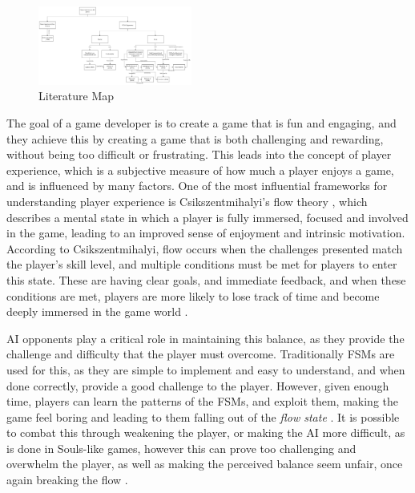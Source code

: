 \documentclass[conference]{IEEEtran}
\begin{document}
\begin{figure}[htbp]
	\centering
	\includegraphics[width=0.45\textwidth]{Images/Literature_Map.png}
	\caption{Literature Map}
	\label{fig:literature_map}
\end{figure}

The goal of a game developer is to create a game that is fun and engaging, and they achieve this by creating a game that is both challenging and rewarding, without being too difficult or frustrating.
This leads into the concept of player experience, which is a subjective measure of how much a player enjoys a game, and is influenced by many factors. One of the most influential frameworks for understanding player
experience is Csikszentmihalyi's flow theory \cite{csikszentmihalyi_flow_1990}, which describes a mental state in which a player is fully immersed, focused and involved in the game, leading to an improved sense of
enjoyment and intrinsic motivation. According to Csikszentmihalyi, flow occurs when the challenges presented match the player's skill level, and multiple conditions must be met for players to enter this state.
These are having clear goals, and immediate feedback, and when these conditions are met, players are more likely to lose track of time and become deeply immersed in the game world \cite{csikszentmihalyi_flow_1990}.

AI opponents play a critical role in maintaining this balance, as they provide the challenge and difficulty that the player must overcome. Traditionally FSMs are used for this, as they are simple to implement
and easy to understand, and when done correctly, provide a good challenge to the player. However, given enough time, players can learn the patterns of the FSMs, and exploit them,
making the game feel boring and leading to them falling out of the \textit{flow state} \cite{noauthor_comparative_nodate}. It is possible to combat this through weakening the player, or making the AI more difficult,
as is done in Souls-like games, however this can prove too challenging and overwhelm the player, as well as making the perceived balance seem unfair, once again breaking the flow \cite{jagdale_finite_2021} \cite{noauthor_finite_2020}.
\end{document}
